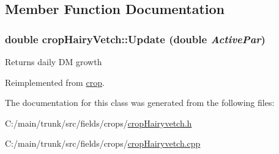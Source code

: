 \subsection{Member Function Documentation}
\hypertarget{classcrop_hairy_vetch_a4a1d386caee18a4ae111c5b8a1448d48}{
\subsubsection[{Update}]{\setlength{\rightskip}{0pt plus 5cm}double cropHairyVetch::Update (double {\em ActivePar})}}
\label{classcrop_hairy_vetch_a4a1d386caee18a4ae111c5b8a1448d48}
Returns daily DM growth 

Reimplemented from \hyperlink{classcrop_a9ed02462e332fffb65498075e7499bf4}{crop}.

The documentation for this class was generated from the following files:\begin{DoxyCompactItemize}
\item 
C:/main/trunk/src/fields/crops/\hyperlink{crop_hairyvetch_8h}{cropHairyvetch.h}\item 
C:/main/trunk/src/fields/crops/\hyperlink{crop_hairyvetch_8cpp}{cropHairyvetch.cpp}\end{DoxyCompactItemize}
